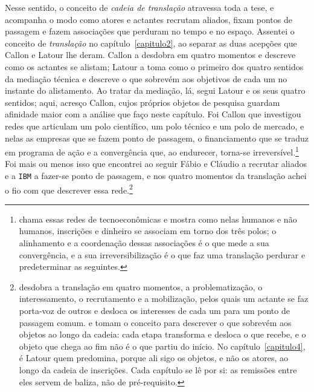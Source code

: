Nesse sentido, o conceito de \textit{cadeia de translação} atravessa toda a tese, e acompanha o modo como atores e actantes recrutam aliados, fixam pontos de passagem e fazem associações que perduram no tempo e no espaço. Assentei o conceito de \textit{translação} no capítulo~\ref{capitulo2}, ao separar as duas acepções que Callon e Latour lhe deram. Callon a desdobra em quatro momentos e descreve como os actantes se alistam; Latour a toma como o primeiro dos quatro sentidos da mediação técnica e descreve o que sobrevém aos objetivos de cada um no instante do alistamento. Ao tratar da mediação, lá, segui Latour e os seus quatro sentidos; aqui, acresço Callon, cujos próprios objetos de pesquisa guardam afinidade maior com a análise que faço neste capítulo. Foi Callon que investigou redes que articulam um polo científico, um polo técnico e um polo de mercado, e nelas as empresas que se fazem ponto de passagem, o financiamento que se traduz em programa de ação e a convergência que, ao endurecer, torna-se irreversível.\footnote{\textcite{Callon1991Techno} chama essas redes de tecnoeconômicas e mostra como nelas humanos e não humanos, inscrições e dinheiro se associam em torno dos três polos; o alinhamento e a coordenação dessas associações é o que mede a sua convergência, e a sua irreversibilização é o que faz uma translação perdurar e predeterminar as seguintes.} Foi mais ou menos isso que encontrei ao seguir Fábio e Cláudio a recrutar aliados e a \texttt{IBM} a fazer-se ponto de passagem, e nos quatro momentos da translação achei o fio com que descrever essa rede.\footnote{\textcite{Callon1986Sociology} desdobra a translação em quatro momentos, a problematização, o interessamento, o recrutamento e a mobilização, pelos quais um actante se faz porta-voz de outros e desloca os interesses de cada um para um ponto de passagem comum. \textcite{Latour2011CienciaEmAcao} e \textcite{Latour2017Esperanca} tomam o conceito para descrever o que sobrevém aos objetos ao longo da cadeia: cada etapa transforma e desloca o que recebe, e o objeto que chega ao fim não é o que partiu do início. No capítulo~\ref{capitulo4}, é Latour quem predomina, porque ali sigo os objetos, e não os atores, ao longo da cadeia de inscrições. Cada capítulo se lê por si: as remissões entre eles servem de baliza, não de pré-requisito.}

